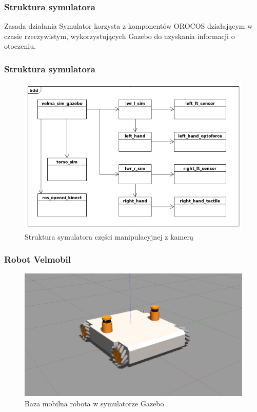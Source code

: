 
\begin{frame}
\frametitle{Struktura symulatora}
\begin{block}{Zasada działania}
	Symulator korzysta z komponentów OROCOS działającym w czasie rzeczywistym, wykorzystujących Gazebo
	do uzyskania informacji o otoczeniu.
\end{block}
\end{frame}


\begin{frame}
	\frametitle{Struktura symulatora}
	\begin{figure}
	\includegraphics[scale=0.40]{./images/velma_sim_bdd.png}
	\caption{Struktura symulatora części manipulacyjnej z kamerą}
	\end{figure}
\end{frame}


\begin{frame} 
\frametitle{Robot Velmobil}
\begin{figure}
\includegraphics[scale=0.20]{./images/omnivelma_gz.png}
\caption{Baza mobilna robota w symulatorze Gazebo}
\end{figure}
\end{frame}

